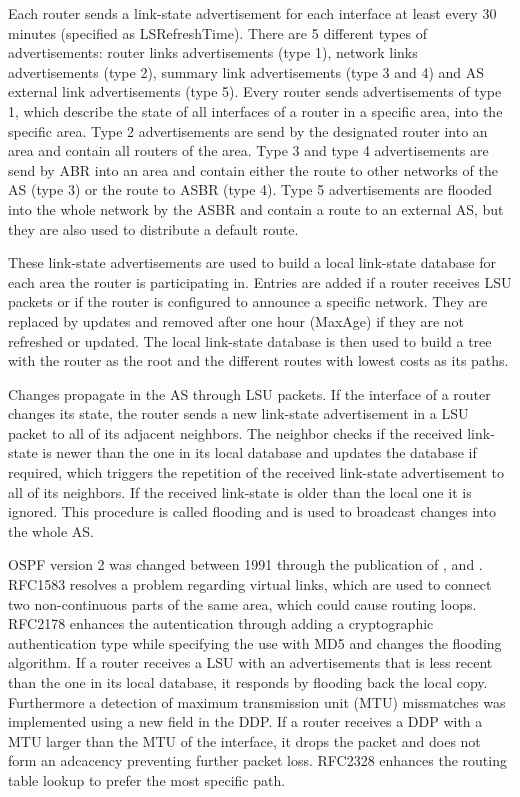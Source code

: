 \documentclass{acm_proc_article-sp}
\begin{document}
Each router sends a link-state advertisement for each interface at least every 30 minutes (specified as LSRefreshTime). There are 5 different types of advertisements: router links advertisements (type 1), network links advertisements (type 2), summary link advertisements (type 3 and 4) and AS external link advertisements (type 5). Every router sends advertisements of type 1, which describe the state of all interfaces of a router in a specific area, into the specific area. Type 2 advertisements are send by the designated router into an area and contain all routers of the area. Type 3 and type 4 advertisements are send by ABR into an area and contain either the route to other networks of the AS (type 3) or the route to ASBR (type 4). Type 5 advertisements are flooded into the whole network by the ASBR and contain a route to an external AS, but they are also used to distribute a default route.

These link-state advertisements are used to build a local link-state database for each area the router is participating in. Entries are added if a router receives LSU packets or if the router is configured to announce a specific network. They are replaced by updates and removed after one hour (MaxAge) if they are not refreshed or updated. The local link-state database is then used to build a tree with the router as the root and the different routes with lowest costs as its paths.

Changes propagate in the AS through LSU packets. If the interface of a router changes its state, the router sends a new link-state advertisement in a LSU packet to all of its adjacent neighbors. The neighbor checks if the received link-state is newer than the one in its local database and updates the database if required, which triggers the repetition of the received link-state advertisement to all of its neighbors. If the received link-state is older than the local one it is ignored. This procedure is called flooding and is used to broadcast changes into the whole AS.

OSPF version 2 was changed between 1991 through the publication of \cite{RFC1538}, \cite{RFC2178} and \cite{RFC2328}. RFC1583 resolves a problem regarding virtual links, which are used to connect two non-continuous parts of the same area, which could cause routing loops. RFC2178 enhances the autentication through adding a cryptographic authentication type while specifying the use with MD5 and changes the flooding algorithm. If a router receives a LSU with an advertisements that is less recent than the one in its local database, it responds by flooding back the local copy. Furthermore a detection of maximum transmission unit (MTU) missmatches was implemented using a new field in the DDP. If a router receives a DDP with a MTU larger than the MTU of the interface, it drops the packet and does not form an adcacency preventing further packet loss. RFC2328 enhances the routing table lookup to prefer the most specific path.
\end{document}
